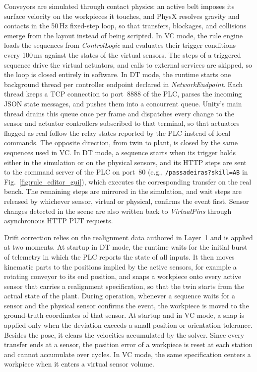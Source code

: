 \documentclass{ieeeojies}
\begin{document}
Conveyors are simulated through contact physics: an active belt imposes its surface velocity on the workpieces it touches, and PhysX resolves gravity and contacts in the 50\,Hz fixed-step loop, so that transfers, blockages, and collisions emerge from the layout instead of being scripted. In VC mode, the rule engine loads the sequences from \textit{ControlLogic} and evaluates their trigger conditions every 100\,ms against the states of the virtual sensors. The steps of a triggered sequence drive the virtual actuators, and calls to external services are skipped, so the loop is closed entirely in software. In DT mode, the runtime starts one background thread per controller endpoint declared in \textit{NetworkEndpoint}. Each thread keeps a TCP connection to port~8888 of the PLC, parses the incoming JSON state messages, and pushes them into a concurrent queue. Unity's main thread drains this queue once per frame and dispatches every change to the sensor and actuator controllers subscribed to that terminal, so that actuators flagged as real follow the relay states reported by the PLC instead of local commands. The opposite direction, from twin to plant, is closed by the same sequences used in VC. In DT mode, a sequence starts when its trigger holds either in the simulation or on the physical sensors, and its HTTP steps are sent to the command server of the PLC on port~80 (e.g., \texttt{/passadeiras?skill=AB} in Fig.~\ref{fig:rule_editor_gui}), which executes the corresponding transfer on the real bench. The remaining steps are mirrored in the simulation, and wait steps are released by whichever sensor, virtual or physical, confirms the event first. Sensor changes detected in the scene are also written back to \textit{VirtualPins} through asynchronous HTTP PUT requests.

Drift correction relies on the realignment data authored in Layer~1 and is applied at two moments. At startup in DT mode, the runtime waits for the initial burst of telemetry in which the PLC reports the state of all inputs. It then moves kinematic parts to the positions implied by the active sensors, for example a rotating conveyor to its end position, and snaps a workpiece onto every active sensor that carries a realignment specification, so that the twin starts from the actual state of the plant. During operation, whenever a sequence waits for a sensor and the physical sensor confirms the event, the workpiece is moved to the ground-truth coordinates of that sensor. At startup and in VC mode, a snap is applied only when the deviation exceeds a small position or orientation tolerance. Besides the pose, it clears the velocities accumulated by the solver. Since every transfer ends at a sensor, the position error of a workpiece is reset at each station and cannot accumulate over cycles. In VC mode, the same specification centers a workpiece when it enters a virtual sensor volume.
\end{document}
